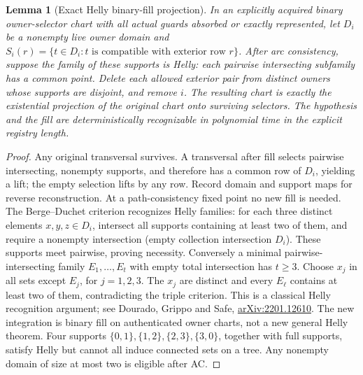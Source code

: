 \documentclass[11pt]{article}
\newtheorem{lemma}[theorem]{Lemma}
\begin{document}
\begin{lemma}[Exact Helly binary-fill projection]\label{lem:bh18-helly}
In an explicitly acquired binary owner-selector chart with all actual guards absorbed or exactly represented, let $D_i$ be a nonempty live owner domain and $S_i(r)=\{t\in D_i:t\text{ is compatible with exterior row }r\}$. After arc consistency, suppose the family of these supports is Helly: each pairwise intersecting subfamily has a common point. Delete each allowed exterior pair from distinct owners whose supports are disjoint, and remove $i$. The resulting chart is exactly the existential projection of the original chart onto surviving selectors. The hypothesis and the fill are deterministically recognizable in polynomial time in the explicit registry length.
\end{lemma}
\begin{proof}
Any original transversal survives. A transversal after fill selects pairwise intersecting, nonempty supports, and therefore has a common row of $D_i$, yielding a lift; the empty selection lifts by any row. Record domain and support maps for reverse reconstruction. At a path-consistency fixed point no new fill is needed. The Berge--Duchet criterion recognizes Helly families: for each three distinct elements $x,y,z\in D_i$, intersect all supports containing at least two of them, and require a nonempty intersection (empty collection intersection $D_i$). These supports meet pairwise, proving necessity. Conversely a minimal pairwise-intersecting family $E_1,\ldots,E_t$ with empty total intersection has $t\ge3$. Choose $x_j$ in all sets except $E_j$, for $j=1,2,3$. The $x_j$ are distinct and every $E_\ell$ contains at least two of them, contradicting the triple criterion. This is a classical Helly recognition argument; see Dourado, Grippo and Safe, \href{https://arxiv.org/abs/2201.12610}{arXiv:2201.12610}. The new integration is binary fill on authenticated owner charts, not a new general Helly theorem. Four supports $\{0,1\},\{1,2\},\{2,3\},\{3,0\}$, together with full supports, satisfy Helly but cannot all induce connected sets on a tree. Any nonempty domain of size at most two is eligible after AC.
\end{proof}
\end{document}
